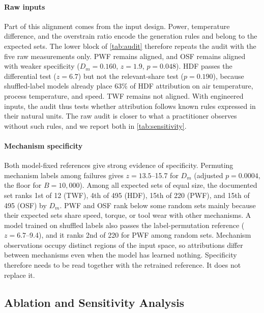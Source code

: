 \documentclass[conference]{IEEEtran}
\begin{document}
\paragraph{Raw inputs}
Part of this alignment comes from the input design. Power, temperature difference, and the overstrain ratio encode the generation rules and belong to the expected sets. The lower block of \cref{tab:audit} therefore repeats the audit with the five raw measurements only. PWF remains aligned, and OSF remains aligned with weaker specificity ($D_m=0.160$, $z=1.9$, $p=0.048$). HDF passes the differential test ($z=6.7$) but not the relevant-share test ($p=0.190$), because shuffled-label models already place 63\% of HDF attribution on air temperature, process temperature, and speed. TWF remains not aligned. With engineered inputs, the audit thus tests whether attribution follows known rules expressed in their natural units. The raw audit is closer to what a practitioner observes without such rules, and we report both in \cref{tab:sensitivity}.

\paragraph{Mechanism specificity}
Both model-fixed references give strong evidence of specificity. Permuting mechanism labels among failures gives $z=13.5$--15.7 for $D_m$ (adjusted $p=0.0004$, the floor for $B=10{,}000$). Among all expected sets of equal size, the documented set ranks 1st of 12 (TWF), 4th of 495 (HDF), 15th of 220 (PWF), and 15th of 495 (OSF) by $D_m$. PWF and OSF rank below some random sets mainly because their expected sets share speed, torque, or tool wear with other mechanisms. A model trained on shuffled labels also passes the label-permutation reference ($z=6.7$--9.4), and it ranks 2nd of 220 for PWF among random sets. Mechanism observations occupy distinct regions of the input space, so attributions differ between mechanisms even when the model has learned nothing. Specificity therefore needs to be read together with the retrained reference. It does not replace it.


\subsection{Ablation and Sensitivity Analysis}
\label{sec:robust}

\end{document}

